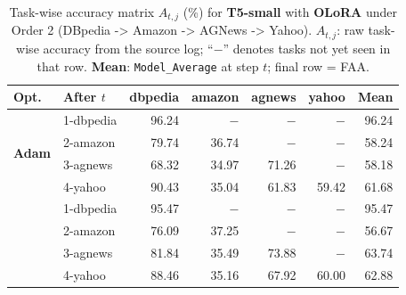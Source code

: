 \begin{table}[ht]
\centering
\caption{%
  Task-wise accuracy matrix $A_{t,j}$ (\%) for \textbf{T5-small} with \textbf{OLoRA} under Order 2 (DBpedia -> Amazon -> AGNews -> Yahoo).
  $A_{t,j}$: raw task-wise accuracy from the source log; ``$-$'' denotes tasks not yet seen in that row.
  \textbf{Mean}: \texttt{Model\_Average} at step $t$; final row = FAA.
}
\label{tab:nlp_o2_t5small_olora}
\setlength{\tabcolsep}{4.0pt}
\renewcommand{\arraystretch}{0.92}
\scriptsize
\begin{tabular}{@{}l l r r r r r@{}}
\toprule
\textbf{Opt.} & \textbf{After $t$} & \textbf{dbpedia} & \textbf{amazon} & \textbf{agnews} & \textbf{yahoo} & \textbf{Mean} \\
\midrule
\multirow{4}{*}{\textbf{Adam}} & 1-dbpedia & 96.24 & $-$ & $-$ & $-$ & 96.24 \\
 & 2-amazon & 79.74 & 36.74 & $-$ & $-$ & 58.24 \\
 & 3-agnews & 68.32 & 34.97 & 71.26 & $-$ & 58.18 \\
 & 4-yahoo & 90.43 & 35.04 & 61.83 & 59.42 & 61.68 \\
\addlinespace[2pt]
\multirow{4}{*}{\textbf{SAM}} & 1-dbpedia & 95.47 & $-$ & $-$ & $-$ & 95.47 \\
 & 2-amazon & 76.09 & 37.25 & $-$ & $-$ & 56.67 \\
 & 3-agnews & 81.84 & 35.49 & 73.88 & $-$ & 63.74 \\
 & 4-yahoo & 88.46 & 35.16 & 67.92 & 60.00 & 62.88 \\
\bottomrule
\end{tabular}
\end{table}
